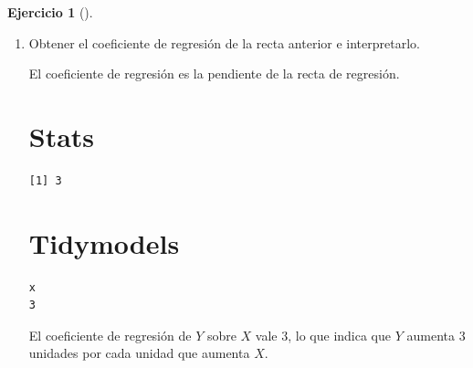 \documentclass[
  a4paper,
]{scrreport}
\newenvironment{Shaded}{\begin{snugshade}}{\end{snugshade}}
\newcommand{\DecValTok}[1]{\textcolor[rgb]{0.68,0.00,0.00}{#1}}
\newcommand{\NormalTok}[1]{\textcolor[rgb]{0.00,0.23,0.31}{#1}}
\newcommand{\SpecialCharTok}[1]{\textcolor[rgb]{0.37,0.37,0.37}{#1}}
\newcommand{\StringTok}[1]{\textcolor[rgb]{0.13,0.47,0.30}{#1}}
\theoremstyle{definition}
\newtheorem{exercise}{Ejercicio}[chapter]
\theoremstyle{remark}
\begin{document}
\begin{exercise}[]
\begin{enumerate}
\begin{tcolorbox}
  La recta de regresión de \(Y\) sobre \(X\) es \(y = 2 + 3 x\).

  \end{tcolorbox}
\item
  Obtener el coeficiente de regresión de la recta anterior e
  interpretarlo.

  \begin{tcolorbox}[enhanced jigsaw, colframe=quarto-callout-tip-color-frame, toprule=.15mm, bottomtitle=1mm, breakable, opacitybacktitle=0.6, toptitle=1mm, colback=white, bottomrule=.15mm, title=\textcolor{quarto-callout-tip-color}{\faLightbulb}\hspace{0.5em}{Solución}, arc=.35mm, left=2mm, titlerule=0mm, rightrule=.15mm, coltitle=black, leftrule=.75mm, opacityback=0, colbacktitle=quarto-callout-tip-color!10!white]

  El coeficiente de regresión es la pendiente de la recta de regresión.

  \section{Stats}

\begin{Shaded}
\end{Shaded}

\begin{verbatim}
[1] 3
\end{verbatim}

  \section{Tidymodels}

\begin{Shaded}
\end{Shaded}

\begin{verbatim}
x 
3 
\end{verbatim}

  El coeficiente de regresión de \(Y\) sobre \(X\) vale 3, lo que indica
  que \(Y\) aumenta 3 unidades por cada unidad que aumenta \(X\).


\end{tcolorbox}
\end{enumerate}
\end{exercise}
\end{document}
